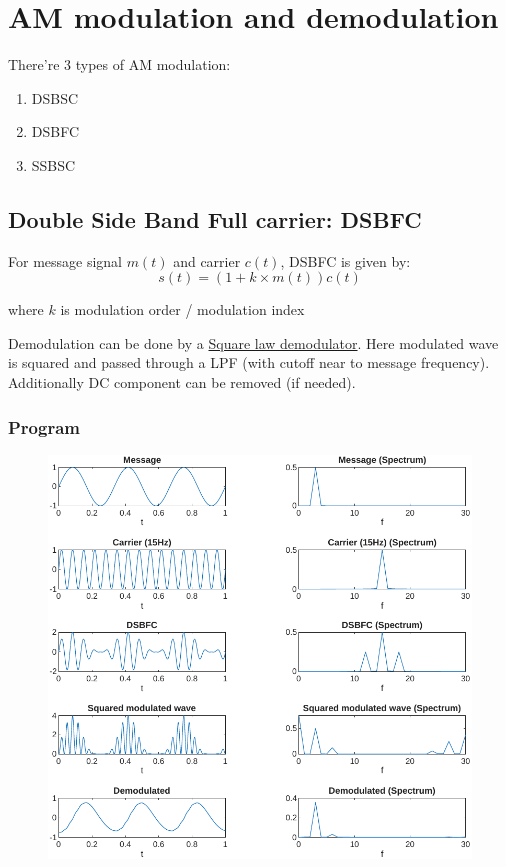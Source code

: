 \chapter{AM modulation and demodulation}
There're 3 types of AM modulation:
\begin{enumerate}
	\item DSBSC
	\item DSBFC
	\item SSBSC
\end{enumerate}

\section{Double Side Band Full carrier: DSBFC}
\setlength{\parindent}{0pt}

For message signal $m(t)$ and carrier $c(t)$, DSBFC is given by:
$$s(t) = (1 + k \times m(t)) c(t)$$

where $k$ is modulation order / modulation index


Demodulation can be done by a \underline{Square law demodulator}. Here modulated wave is squared and passed through a LPF (with cutoff near to message frequency). Additionally DC component can be removed (if needed).

\subsection*{Program}

\begin{figure}[H]
	\centering
	\includegraphics[width=\textwidth]{img/dsbfc.pdf}
\end{figure}

